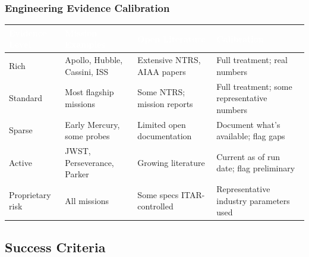 \documentclass[11pt,letterpaper]{article}
\newcommand{\tableheader}[1]{\textbf{\sffamily\textcolor{white}{#1}}}
\begin{document}
\subsubsection{Engineering Evidence Calibration}

\begin{center}
\begin{tabularx}{\textwidth}{L{2.5cm}L{3.5cm}L{2.5cm}X}
\toprule
{}
\tableheader{Evidence Level} & \tableheader{Mission Examples} & \tableheader{Open Literature} & \tableheader{Calibration} \\
\midrule
Rich & Apollo, Hubble, Cassini, ISS & Extensive NTRS, AIAA papers & Full treatment; real numbers \\
Standard & Most flagship missions & Some NTRS; mission reports & Full treatment; some representative numbers \\
Sparse & Early Mercury, some probes & Limited open documentation & Document what's available; flag gaps \\
Active & JWST, Perseverance, Parker & Growing literature & Current as of run date; flag preliminary \\
Proprietary risk & All missions & Some specs ITAR-controlled & Representative industry parameters used \\
\bottomrule
\end{tabularx}
\end{center}

\subsection{Success Criteria}
\end{document}

